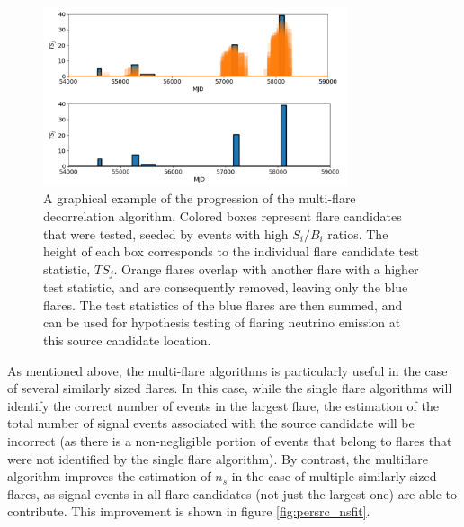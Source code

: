 \begin{figure}[h]
\centering
\includegraphics[width=0.8\textwidth]{figs/mf_algorithm.png}
\caption{A graphical example of the progression of the multi-flare decorrelation algorithm. Colored boxes represent flare candidates that were tested, seeded by events with high $S_i/B_i$ ratios. The height of each box corresponds to the individual flare candidate test statistic, $TS_j$. Orange flares overlap with another flare with a higher test statistic, and are consequently removed, leaving only the blue flares. The test statistics of the blue flares are then summed, and can be used for hypothesis testing of flaring neutrino emission at this source candidate location.}
\label{fig:mf_algorithm}
\end{figure}


As mentioned above, the multi-flare algorithms is particularly useful in the case of several similarly sized flares. In this case, while the single flare algorithms will identify the correct number of events in the largest flare, the estimation of the total number of signal events associated with the source candidate will be incorrect (as there is a non-negligible portion of events that belong to flares that were not identified by the single flare algorithm). By contrast, the multiflare algorithm improves the estimation of $n_s$ in the case of multiple similarly sized flares, as signal events in all flare candidates (not just the largest one) are able to contribute. This improvement is shown in figure \ref{fig:persrc_nsfit}.

